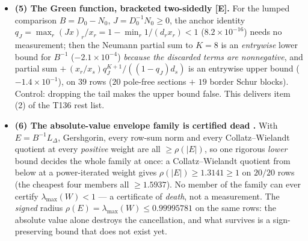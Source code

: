 \documentclass[11pt]{article}
\providecommand{\mE}{\textbf{[E]}}\providecommand{\mC}{\textbf{[C]}}
\begin{document}
\begin{itemize}[leftmargin=1.5em]
off-diagonal of $A$ is comb-generated (control: the full section carries $+2.0\times10^{-1}$). Every
one of the $20555$ positive edges has its Hankel index $M-1-r-t$ inside the atom-hat index set ---
per-window fraction exactly $1.000000$ --- so $\mathrm{supp}(\Delta)$ is a union of anti-diagonal
stripes at prime-power atom positions (the converse is reported, \emph{not} claimed). Each stripe is
a perfect matching ($0$ endpoint collisions), so its edge vectors $b_e=e_r-e_t$ are \emph{exactly}
orthogonal and $L_\Delta$ restricted to a stripe is a direct sum of $2\times2$ blocks (control:
edges across two stripes overlap). And $A_{rs}=A^{\mathrm{arch}}_{rs}-c_{\mathrm{comb}}[|r-s|]
+c_{\mathrm{comb}}[\mathrm{anti}]$ gives the amplitude certificate
$\Delta_{rt}\le c_{\mathrm{comb}}[M-1-r-t]$ on all $20555$ edges (excess $-1.9\times10^{-6}$,
sharpest ratio $0.99998532$) --- no eigenvalue, no norm; control: the Toeplitz lag in place of the
Hankel index breaks it on $20415/20555$. Honestly undecided and \emph{not} promoted: at $h\le300$
the hats never overlap, so the tighter one-atom refinement coincides with the certificate here.
\item \textbf{(5) The Green function, bracketed two-sidedly \mE.} For the lumped comparison
$B=D_0-N_0$, $J=D_0^{-1}N_0\ge0$, the anchor identity
$q_J=\max_r(Jx)_r/x_r=1-\min_r 1/(d_rx_r)<1$ ($8.2\times10^{-16}$) needs no measurement; then the
Neumann partial sum to $K=8$ is an \emph{entrywise} lower bound for $B^{-1}$ ($-2.1\times10^{-4}$)
\emph{because the discarded terms are nonnegative}, and partial sum
$+\,(x_r/x_s)q_J^{K+1}/((1-q_J)d_s)$ is an entrywise upper bound ($-1.4\times10^{-1}$), on $39$ rows
($20$ pole-free sections $+$ $19$ border Schur blocks). Control: dropping the tail makes the upper
bound false. This delivers item (2) of the T136 rest list.
\item \textbf{(6) The absolute-value envelope family is certified dead \mX.} With $E=B^{-1}L_\Delta$,
Gershgorin, every row-sum norm and every Collatz--Wielandt quotient at every \emph{positive} weight
are all $\ge\rho(|E|)$, so one rigorous \emph{lower} bound decides the whole family at once: a
Collatz--Wielandt quotient from below at a power-iterated weight gives $\rho(|E|)\ge1.3141\ge1$ on
$20/20$ rows (the cheapest four members all $\ge1.5937$). No member of the family can ever certify
$\lambda_{\max}(W)<1$ --- a certificate of \emph{death}, not a measurement. The \emph{signed}
radius $\rho(E)=\lambda_{\max}(W)\le0.99995781$ on the same rows: the absolute value alone destroys
the cancellation, and what survives is a sign-preserving bound that does not exist yet.

\end{itemize}
\end{document}
